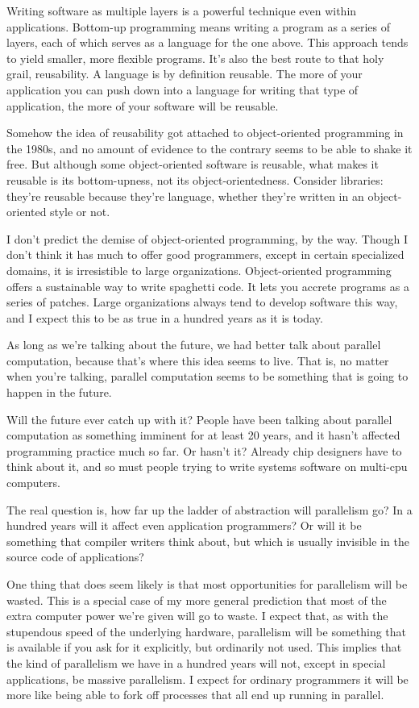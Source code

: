 \documentclass[12pt]{book}
\begin{document}
Writing software as multiple layers is a powerful technique even within
applications. Bottom-up programming means writing a program as a series
of layers, each of which serves as a language for the one above. This
approach tends to yield smaller, more flexible programs. It's also the
best route to that holy grail, reusability. A language is by definition
reusable. The more of your application you can push down into a language
for writing that type of application, the more of your software will be
reusable.

Somehow the idea of reusability got attached to object-oriented
programming in the 1980s, and no amount of evidence to the contrary
seems to be able to shake it free. But although some object-oriented
software is reusable, what makes it reusable is its bottom-upness, not
its object-orientedness. Consider libraries: they're reusable because
they're language, whether they're written in an object-oriented style or
not.

I don't predict the demise of object-oriented programming, by the way.
Though I don't think it has much to offer good programmers, except in
certain specialized domains, it is irresistible to large organizations.
Object-oriented programming offers a sustainable way to write spaghetti
code. It lets you accrete programs as a series of patches. Large
organizations always tend to develop software this way, and I expect
this to be as true in a hundred years as it is today.

As long as we're talking about the future, we had better talk about
parallel computation, because that's where this idea seems to live. That
is, no matter when you're talking, parallel computation seems to be
something that is going to happen in the future.

Will the future ever catch up with it? People have been talking about
parallel computation as something imminent for at least 20 years, and it
hasn't affected programming practice much so far. Or hasn't it? Already
chip designers have to think about it, and so must people trying to
write systems software on multi-cpu computers.

The real question is, how far up the ladder of abstraction will
parallelism go? In a hundred years will it affect even application
programmers? Or will it be something that compiler writers think about,
but which is usually invisible in the source code of applications?

One thing that does seem likely is that most opportunities for
parallelism will be wasted. This is a special case of my more general
prediction that most of the extra computer power we're given will go to
waste. I expect that, as with the stupendous speed of the underlying
hardware, parallelism will be something that is available if you ask for
it explicitly, but ordinarily not used. This implies that the kind of
parallelism we have in a hundred years will not, except in special
applications, be massive parallelism. I expect for ordinary programmers
it will be more like being able to fork off processes that all end up
running in parallel.
\end{document}
